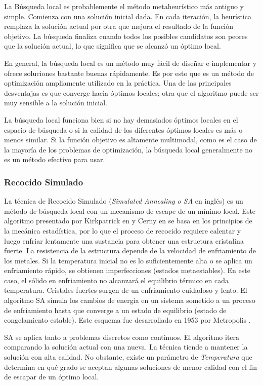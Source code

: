 La Búsqueda local es probablemente el método metaheurístico más antiguo y simple. Comienza con una solución inicial dada. En cada iteración, la heurística remplaza la solución actual por otra que mejora el resultado de la función objetivo. La búsqueda finaliza cuando todos los posibles candidatos son peores que la solución actual, lo que significa que se alcanzó un óptimo local.

En general, la búsqueda local es un método muy fácil de diseñar e implementar y ofrece soluciones bastante buenas rápidamente. Es por esto que es un método de optimización ampliamente utilizado en la práctica. Una de las principales desventajas es que converge hacia óptimos locales; otra que el algoritmo puede ser muy sensible a la solución inicial.

La búsqueda local funciona bien si no hay demasiados óptimos locales en el espacio de búsqueda o si la calidad de los diferentes óptimos locales es más o menos similar. Si la función objetivo es altamente multimodal, como es el caso de la mayoría de los problemas de optimización, la búsqueda local generalmente no es un método efectivo para usar.

\subsubsection{Recocido Simulado}

La técnica de Recocido Simulado (\textit{Simulated Annealing o SA} en inglés) es un método de búsqueda local con un mecanismo de escape de un mínimo local. Este algoritmo presentado por Kirkpatrick en \cite{KirkpatrickVecchi} y Cerny en \cite{Cerny} se basa en los principios de la mecánica estadística, por lo que el proceso de recocido requiere calentar y luego enfriar lentamente una sustancia para obtener una estructura cristalina fuerte. La resistencia de la estructura depende de la velocidad de enfriamiento de los metales. Si la temperatura inicial no es lo suficientemente alta o se aplica un enfriamiento rápido, se obtienen imperfecciones (estados metaestables). En este caso, el sólido en enfriamiento no alcanzará el equilibrio térmico en cada temperatura. Cristales fuertes surgen de un enfriamiento cuidadoso y lento. El algoritmo SA simula los cambios de energía en un sistema sometido a un proceso de enfriamiento hasta que converge a un estado de equilibrio (estado de congelamiento estable). Este esquema fue desarrollado en 1953 por Metropolis \cite{MetropolisRosenbluth}.

SA se aplica tanto a problemas discretos como continuos. El algoritmo itera comparando la solución actual con una nueva. La técnica tiende a mantener la solución con alta calidad. No obstante, existe un parámetro de \textit{Temperatura} que determina en qué grado se aceptan algunas soluciones de menor calidad con el fin de escapar de un óptimo local.



